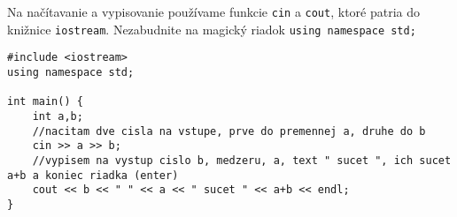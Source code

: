 
Na načítavanie a vypisovanie používame funkcie \texttt{cin} a \texttt{cout}, ktoré patria do
knižnice \texttt{iostream}. Nezabudnite na magický riadok \texttt{using namespace std;}

\begin{lstlisting}
#include <iostream>
using namespace std;

int main() {
    int a,b;
    //nacitam dve cisla na vstupe, prve do premennej a, druhe do b
    cin >> a >> b;
    //vypisem na vystup cislo b, medzeru, a, text " sucet ", ich sucet a+b a koniec riadka (enter)
    cout << b << " " << a << " sucet " << a+b << endl;
}
\end{lstlisting}


